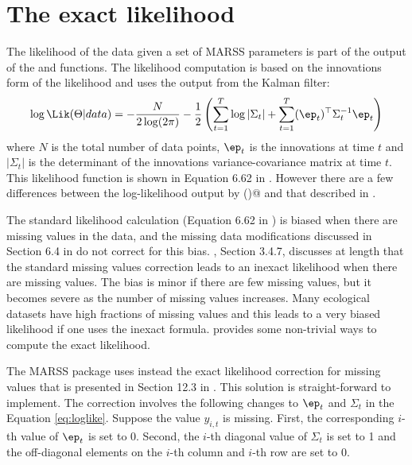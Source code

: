 \section{The exact likelihood}
\label{sec:exactlikelihood}
The likelihood of the data given a set of MARSS parameters is part of the output of the \verb@MARSSkfss@{} and \verb@MARSSkfas@{}
 functions.  The likelihood computation is based on the innovations form of the likelihood \citep{Schweppe1965} and uses the output from the Kalman filter:
\begin{equation}
\log \Lik(\Theta | data) = -\frac{N}{2\log(2\pi)} - \frac{1}{2}\left( \sum_{t=1}^T\log |\Sigma_t| + \sum_{t=1}^T (\ep_t)^\top \Sigma_t^{-1} \ep_t \right)
\label{eq:loglike}
\end{equation}
where $N$ is the total number of data points, $\ep_t$ is the innovations at time $t$ and $|\Sigma_t|$ is the determinant of the innovations variance-covariance matrix at time $t$.  This likelihood function is shown in Equation 6.62 in \citet{ShumwayStoffer2006}. However there are a few differences between the log-likelihood output by \verb@MARSSkf()@ and that described in \citet{ShumwayStoffer2006}.

The standard likelihood calculation (Equation 6.62 in \citet{ShumwayStoffer2006}) is biased when there are missing values in the data, and the missing data modifications discussed in Section 6.4 in \citet{ShumwayStoffer2006} do not correct for this bias. \citet{Harvey1989}, Section 3.4.7, discusses at length that the standard missing values correction leads to an inexact likelihood when there are missing values. The bias is minor if there are few missing values, but it becomes severe as the number of missing values increases.  Many ecological datasets have high fractions of missing values and this  leads to a very biased likelihood if one uses the inexact formula.  \citet{Harvey1989} provides some non-trivial ways to compute the exact likelihood.  

The MARSS package uses instead the exact likelihood correction for missing values that is presented in Section 12.3 in \citet{BrockwellDavis1991}.  This solution is straight-forward to implement.  The correction involves the following changes to $\ep_t$ and $\Sigma_t$ in the Equation \ref{eq:loglike}.  Suppose the value $y_{i,t}$ is missing.  First, the corresponding $i$-th value of $\ep_t$ is set to 0.  Second, the $i$-th diagonal value of $\Sigma_t$ is set to 1 and the off-diagonal elements on the $i$-th column and $i$-th row are set to 0. 

